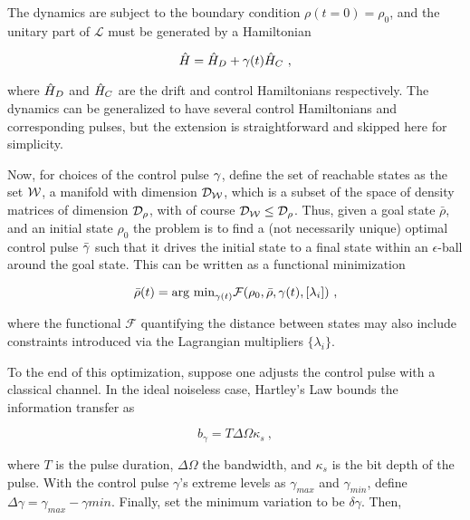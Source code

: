 The dynamics are subject to the boundary condition \(\rho(t=0) = \rho_0\), and
the unitary part of \(\mathcal{L}\) must be generated by a Hamiltonian

\begin{equation}
    \hat{H} = \hat{H}_D + \gamma(t) \hat{H}_C~,
\end{equation}

where \(\hat{H}_D\) and \(\hat{H}_C\) are the drift and control
Hamiltonians respectively. The dynamics can be generalized to have several
control Hamiltonians and corresponding pulses, but the extension is
straightforward and skipped here for simplicity.

Now, for choices of the control pulse \(\gamma\), define the set of
reachable states as the set \(\mathcal{W}\), a manifold with dimension
\(\mathcal{D}_{\mathcal{W}}\), which is a subset of the space of density matrices of
dimension \(\mathcal{D}_\rho\), with of course \(\mathcal{D}_{\mathcal{W}} \leq \mathcal{D}_\rho\).
Thus, given a goal state \(\bar{\rho}\), and an initial state \(\rho_0\) the
problem is to find a (not necessarily unique) optimal control pulse
\(\bar{\gamma}\) such that it drives the initial state to a final state
within an \(\epsilon\)-ball around the goal state. This can be written as a
functional minimization

\begin{equation}
    \bar{\rho}(t) = \text{arg min}_{\gamma(t)} 
    \mathcal{F}(\rho_0, \bar{\rho}, \gamma(t), [\lambda_i])~,
\end{equation}

where the functional \(\mathcal{F}\) quantifying the distance between states may
also include constraints introduced via the Lagrangian multipliers
\(\{\lambda_i\}\).

To the end of this optimization, suppose one adjusts the control pulse with a
classical channel. In the ideal noiseless case, Hartley's Law bounds the
information transfer as

\begin{equation}
    b_\gamma = T\Delta\Omega\kappa_s~,
\end{equation}

where \(T\) is the pulse duration, \(\Delta\Omega\) the bandwidth, and
\(\kappa_s\) is the bit depth of the pulse. With the control pulse \(\gamma\)'s
extreme levels as \(\gamma_{max}\) and \(\gamma_{min}\), define \(\Delta\gamma =
\gamma_{max} - \gamma{min}\). Finally, set the minimum variation to be
\(\delta\gamma\). Then,

